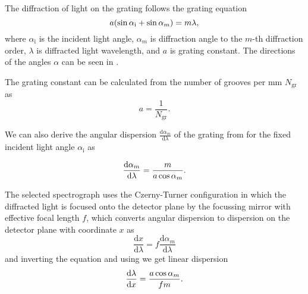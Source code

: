 The diffraction of light on the grating follows the grating equation
\begin{equation}
	a(\sin\alpha_\text{i} + \sin\alpha_m) = m\lambda,
	\label{\eqnlabel{spectrograph_selection:grating_equation}}
\end{equation}
where $\alpha_\text{i}$ is the incident light angle,
	$\alpha_m$ is diffraction angle to the $m$-th diffraction order,
	$\lambda$ is diffracted light wavelength,
	and $a$ is grating constant.
The directions of the angles $\alpha$ can be seen in
.

\begin{figure}
	\centering
	
	\caption[%
		Spectrograph configuration schema.%
	]{%
	}
	\label{\figlabel{spectrograph_selection:configuration_schema}}
\end{figure}

The grating constant can be calculated from the number of grooves per mm
$N_\text{gr}$ as
\begin{equation*}
	a = \frac{1}{N_\text{gr}}.
\end{equation*}

We can also derive the angular dispersion
$\frac{\text{d}\alpha_m}{\text{d}\lambda}$
of the grating from
for the fixed incident light angle $\alpha_\text{i}$ as

\begin{equation}
	\frac{\text{d}\alpha_m}{\text{d}\lambda} = \frac{m}{a\cos\alpha_m}.
	\label{\eqnlabel{spectrograph_selection:angular_dispersion}}
\end{equation}

The selected spectrograph uses the Czerny-Turner configuration in which the
diffracted light is focused onto the detector plane by the focussing mirror
with effective focal length $f$, which converts angular dispersion to
dispersion on the detector plane with coordinate $x$ as
\begin{equation*}
	\frac{\text{d}x}{\text{d}\lambda} =
		f\frac{\text{d}\alpha_m}{\text{d}\lambda}
\end{equation*}
and inverting the equation and using
we get linear dispersion
\begin{equation}
	\frac{\text{d}\lambda}{\text{d}x} = \frac{a\cos\alpha_m}{fm}.
	\label{\eqnlabel{spectrograph_selection:linear_dispersion}}
\end{equation}

